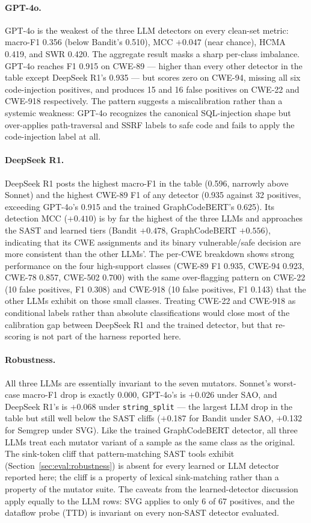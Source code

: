 \paragraph{GPT-4o.} GPT-4o is the weakest of the three LLM detectors
on every clean-set metric: macro-F1 0.356 (below Bandit's 0.510), MCC
$+0.047$ (near chance), HCMA 0.419, and SWR 0.420. The aggregate
result masks a sharp per-class imbalance. GPT-4o reaches F1 0.915 on
CWE-89 — higher than every other detector in the table except DeepSeek
R1's 0.935 — but scores zero on CWE-94, missing all six code-injection
positives, and produces 15 and 16 false positives on CWE-22 and
CWE-918 respectively. The pattern suggests a miscalibration rather
than a systemic weakness: GPT-4o recognizes the canonical SQL-injection
shape but over-applies path-traversal and SSRF labels to safe code
and fails to apply the code-injection label at all.

\paragraph{DeepSeek R1.} DeepSeek R1 posts the highest macro-F1 in
the table (0.596, narrowly above Sonnet) and the highest CWE-89 F1
of any detector (0.935 against 32 positives, exceeding GPT-4o's 0.915
and the trained GraphCodeBERT's 0.625). Its detection MCC ($+0.410$)
is by far the highest of the three LLMs and approaches the SAST and
learned tiers (Bandit $+0.478$, GraphCodeBERT $+0.556$), indicating
that its CWE assignments and its binary vulnerable/safe decision are
more consistent than the other LLMs'. The per-CWE breakdown shows
strong performance on the four high-support classes (CWE-89 F1 0.935,
CWE-94 0.923, CWE-78 0.857, CWE-502 0.700) with the same
over-flagging pattern on CWE-22 (10 false positives, F1 0.308) and
CWE-918 (10 false positives, F1 0.143) that the other LLMs exhibit
on those small classes. Treating CWE-22 and CWE-918 as conditional
labels rather than absolute classifications would close most of the
calibration gap between DeepSeek R1 and the trained detector, but
that re-scoring is not part of the harness reported here.

\paragraph{Robustness.} All three LLMs are essentially invariant to
the seven mutators. Sonnet's worst-case macro-F1 drop is exactly
$0.000$, GPT-4o's is $+$0.026 under SAO, and DeepSeek R1's is
$+$0.068 under \texttt{string\_split} — the largest LLM drop in the
table but still well below the SAST cliffs ($+$0.187 for Bandit
under SAO, $+$0.132 for Semgrep under SVG). Like the trained
GraphCodeBERT detector, all three LLMs treat each mutator variant
of a sample as the same class as the original. The sink-token cliff
that pattern-matching SAST tools exhibit
(Section~\ref{sec:eval:robustness}) is absent for every learned or
LLM detector reported here; the cliff is a property of lexical
sink-matching rather than a property of the mutator suite. The
caveats from the learned-detector discussion apply equally to the
LLM rows: SVG applies to only 6 of 67 positives, and the dataflow
probe (TTD) is invariant on every non-SAST detector evaluated.

